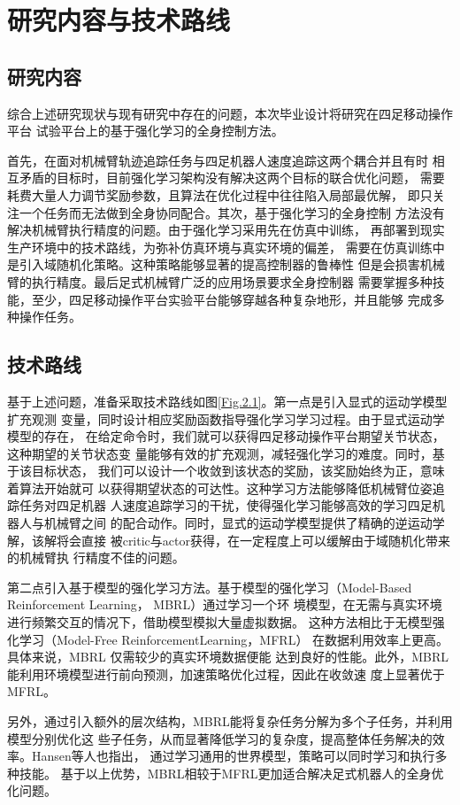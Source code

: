\chapter{研究内容与技术路线}
\section{研究内容}
综合上述研究现状与现有研究中存在的问题，本次毕业设计将研究在四足移动操作平台
试验平台上的基于强化学习的全身控制方法。

首先，在面对机械臂轨迹追踪任务与四足机器人速度追踪这两个耦合并且有时
相互矛盾的目标时，目前强化学习架构没有解决这两个目标的联合优化问题，
需要耗费大量人力调节奖励参数，且算法在优化过程中往往陷入局部最优解，
即只关注一个任务而无法做到全身协同配合。其次，基于强化学习的全身控制
方法没有解决机械臂执行精度的问题。由于强化学习采用先在仿真中训练，
再部署到现实生产环境中的技术路线，为弥补仿真环境与真实环境的偏差，
需要在仿真训练中是引入域随机化策略。这种策略能够显著的提高控制器的鲁棒性
但是会损害机械臂的执行精度。最后足式机械臂广泛的应用场景要求全身控制器
需要掌握多种技能，至少，四足移动操作平台实验平台能够穿越各种复杂地形，并且能够
完成多种操作任务。
\section{技术路线}
基于上述问题，准备采取技术路线如图\ref{Fig.2.1}。第一点是引入显式的运动学模型扩充观测
变量，同时设计相应奖励函数指导强化学习学习过程。由于显式运动学模型的存在，
在给定命令时，我们就可以获得四足移动操作平台期望关节状态，这种期望的关节状态变
量能够有效的扩充观测，减轻强化学习的难度。同时，基于该目标状态，
我们可以设计一个收敛到该状态的奖励，该奖励始终为正，意味着算法开始就可
以获得期望状态的可达性。这种学习方法能够降低机械臂位姿追踪任务对四足机器
人速度追踪学习的干扰，使得强化学习能够高效的学习四足机器人与机械臂之间
的配合动作。同时，显式的运动学模型提供了精确的逆运动学解，该解将会直接
被critic与actor获得，在一定程度上可以缓解由于域随机化带来的机械臂执
行精度不佳的问题。

第二点引入基于模型的强化学习方法。基于模型的强化学习（Model-Based Reinforcement
Learning， MBRL）\cite{hafner2019dream, hansen2022temporal}通过学习一个环
境模型，在无需与真实环境进行频繁交互的情况下，借助模型模拟大量虚拟数据。
这种方法相比于无模型强化学习（Model-Free ReinforcementLearning，MFRL）
在数据利用效率上更高。具体来说，MBRL 仅需较少的真实环境数据便能
达到良好的性能。此外，MBRL 能利用环境模型进行前向预测，加速策略优化过程，因此在收敛速
度上显著优于MFRL。

另外，通过引入额外的层次结构，MBRL能将复杂任务分解为多个子任务，并利用模型分别优化这
些子任务，从而显著降低学习的复杂度，提高整体任务解决的效率。Hansen等人也指出，
通过学习通用的世界模型，策略可以同时学习和执行多种技能\cite{hansen2023td}。
基于以上优势，MBRL相较于MFRL更加适合解决足式机器人的全身优化问题。

